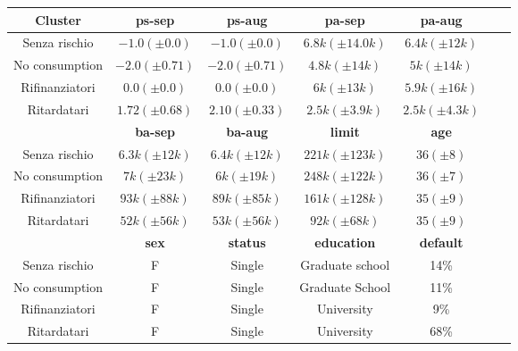 \begin{center}
	
	\begin{tabular}{c|c|c|c|c|c|c}
		\hline
		\textbf{Cluster} & \textbf{ps-sep} 
		& \textbf{ps-aug} & \textbf{pa-sep} 
		& \textbf{pa-aug}\\
		\hline
		Senza rischio & 
		$-1.0 (\pm 0.0)$ & 
		$-1.0 (\pm 0.0)$ &
		$6.8k (\pm 14.0k)$ &
		$6.4k (\pm 12k)$\\
		\hline
		No consumption & 
		$-2.0 (\pm 0.71)$ & 
		$-2.0 (\pm 0.71)$ &
		$4.8k (\pm 14k)$ &
		$5k (\pm 14k)$\\
		\hline
		Rifinanziatori & 
		$0.0 (\pm 0.0)$ & 
		$0.0 (\pm 0.0)$ &
		$6k (\pm 13k)$ &
		$5.9k (\pm 16k)$\\
		\hline
		Ritardatari & 
		$1.72 (\pm 0.68)$ & 
		$2.10 (\pm 0.33)$ &
		$2.5k (\pm 3.9k)$ &
		$2.5k (\pm 4.3k)$\\
		\hline
		& 
		\textbf{ba-sep} & 
		\textbf{ba-aug} & 
		\textbf{limit} & 
		\textbf{age} &\\
		\hline
		Senza rischio & 
		$6.3k (\pm 12k)$ &
		$6.4k (\pm 12k)$ &
		$221k (\pm 123k)$ &
		$36 (\pm 8)$\\
		\hline
		No consumption &
		$7k (\pm 23k)$ &
		$6k (\pm 19k)$ &
		$248k (\pm 122k)$ &
		$36 (\pm 7)$\\
		\hline
		Rifinanziatori &
		$93k (\pm 88k)$ &
		$89k (\pm 85k)$ &
		$161k (\pm 128k)$ &
		$35 (\pm 9)$\\
		\hline
		Ritardatari &
		$52k (\pm 56k)$ &
		$53k (\pm 56k)$ &
		$92k (\pm 68k)$ &
		$35 (\pm 9)$\\
		\hline
		& 
		\textbf{sex} & 
		\textbf{status} & 
		\textbf{education} & 
		\textbf{default}\\
		\hline
		Senza rischio & 
		F &
		Single &
		Graduate school&
		14\%\\
		\hline
		No consumption & 
		F &
		Single &
		Graduate School &
		11\%\\
		\hline
		Rifinanziatori & 
		F &
		Single &
		University&
		9\%\\
		\hline
		Ritardatari & 
		F &
		Single &
		University&
		68\%\\
		\hline
	\end{tabular}
\end{center}


